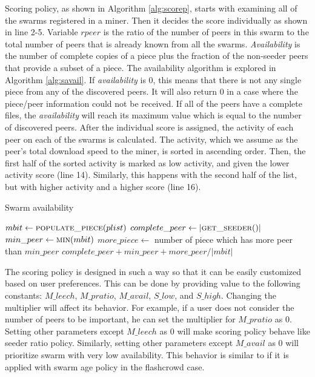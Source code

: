 Scoring policy, as shown in Algorithm \ref{alg:scorep}, starts with examining all of the swarms registered in a miner. Then it decides the score individually as shown in line 2-5. Variable $rpeer$ is the ratio of the number of peers in this swarm to the total number of peers that is already known from all the swarms. \textit{Availability} is the number of complete copies of a piece plus the fraction of the non-seeder peers that provide a subset of a piece. The availability algorithm is explored in Algorithm \ref{alg:savail}. If \textit{availability} is 0, this means that there is not any single piece from any of the discovered peers. It will also return 0 in a case where the piece/peer information could not be received. If all of the peers have a complete files, the \textit{availability} will reach its maximum value which is equal to the number of discovered peers. After the individual score is assigned, the activity of each peer on each of the swarms is calculated. The activity, which we assume as the peer's total download speed to the miner, is sorted in ascending order. Then, the first half of the sorted activity is marked as low activity, and given the lower activity score (line 14). Similarly, this happens with the second half of the list, but with higher activity and a higher score (line 16).

\begin{algorithm}[h]
	\caption{Swarm availability}
	\label{alg:savail}
	\begin{algorithmic}[1]
		\State $mbit \gets \Call{populate\_piece}{plist}$
		\State $complete\_peer \gets |\Call{get\_seeder}{\null}|$ 
		\State $min\_peer \gets \Call{min}{mbit}$
		\State $more\_piece \gets $ number of piece which has more peer than $min\_peer$
		\State \Return $complete\_peer + min\_peer + more\_peer/|mbit|$
	\end{algorithmic}
\end{algorithm}

The scoring policy is designed in such a way so that it can be easily customized based on user preferences. This can be done by providing value to the following constants: $M\_leech$, $M\_pratio$, $M\_avail$, $S\_low$, and $S\_high$. Changing the multiplier will affect its behavior. For example, if a user does not consider the number of peers to be important, he can set the multiplier for $M\_pratio$ as 0. Setting other parameters except $M\_leech$ as 0 will make scoring policy behave like seeder ratio policy. Similarly, setting other parameters except $M\_avail$ as 0 will prioritize swarm with very low availability. This behavior is similar to if it is applied with swarm age policy in the flashcrowd case.

